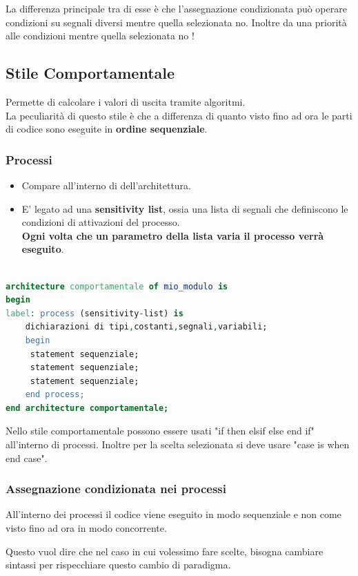 \documentclass[a4paper]{book}
\begin{document}
La differenza principale tra di esse è che l'assegnazione condizionata può operare condizioni su segnali diversi mentre quella selezionata no. Inoltre da una priorità alle condizioni mentre quella selezionata no !

\subsection{Stile Comportamentale}

Permette di calcolare i valori di uscita tramite algoritmi.\\
La peculiarità di questo stile è che a differenza di quanto visto fino ad ora le parti di codice sono eseguite in \textbf{ordine sequenziale}.
\subsubsection{Processi}
\begin{itemize}
\item Compare all'interno di dell'architettura.
\item E' legato ad una \textbf{sensitivity list}, ossia una lista di segnali che definiscono le condizioni di attivazioni del processo.\\\textbf{Ogni volta che un parametro della lista varia il processo verrà eseguito}.


\end{itemize}

\begin{lstlisting}[language=VHDL]

architecture comportamentale of mio_modulo is
begin
label: process (sensitivity-list) is
	dichiarazioni di tipi,costanti,segnali,variabili;
	begin
	 statement sequenziale;
	 statement sequenziale;
	 statement sequenziale;
	end process;
end architecture comportamentale;

\end{lstlisting}
Nello stile comportamentale possono essere usati "if then elsif else end if" all'interno di processi.
Inoltre per la scelta selezionata si deve usare "case is when end case".
\subsubsection{Assegnazione condizionata nei processi}

All'interno dei processi il codice viene eseguito in modo sequenziale e non come visto fino ad ora in modo concorrente.

Questo vuol dire che nel caso in cui volessimo fare scelte, bisogna cambiare sintassi per rispecchiare questo cambio di paradigma.
\end{document}

